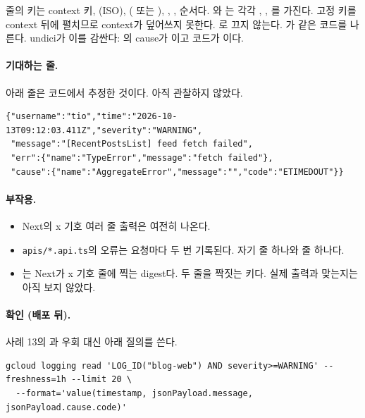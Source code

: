줄의 키는 context 키, (ISO), ( 또는 ), , ,  순서다. 와 는 각각 , , 를 가진다.
고정 키를 context 뒤에 펼치므로 context가 덮어쓰지 못한다.
로 끄지 않는다.
가  같은 코드를 나른다.
undici가 이를 감싼다: 의 cause가 이고 코드가 이다.

\paragraph{기대하는 줄.}
아래 줄은 코드에서 추정한 것이다. 아직 관찰하지 않았다.

\begin{lstlisting}[language={}]
{"username":"tio","time":"2026-10-13T09:12:03.411Z","severity":"WARNING",
 "message":"[RecentPostsList] feed fetch failed",
 "err":{"name":"TypeError","message":"fetch failed"},
 "cause":{"name":"AggregateError","message":"","code":"ETIMEDOUT"}}
\end{lstlisting}

\paragraph{부작용.}
\begin{itemize}[nosep]
  \item Next의 x 기호 여러 줄 출력은 여전히 나온다.
  \item \texttt{apis/*.api.ts}의 오류는 요청마다 두 번 기록된다. 자기 줄 하나와  줄 하나다.
  \item {}는 Next가 x 기호 줄에 찍는 digest다. 두 줄을 짝짓는 키다. 실제 출력과 맞는지는 아직 보지 않았다.
\end{itemize}

\paragraph{확인 (배포 뒤).}
사례 13의 과  우회 대신 아래 질의를 쓴다.

\begin{lstlisting}[language={}]
gcloud logging read 'LOG_ID("blog-web") AND severity>=WARNING' --freshness=1h --limit 20 \
  --format='value(timestamp, jsonPayload.message, jsonPayload.cause.code)'
\end{lstlisting}

